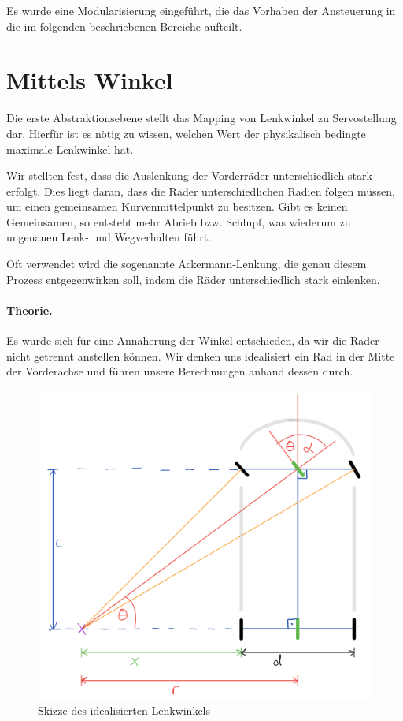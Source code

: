 \documentclass[a4paper,12pt]{report}
\begin{document}
	Es wurde eine Modularisierung eingeführt, die das Vorhaben der Ansteuerung in die im folgenden beschriebenen Bereiche aufteilt.

\section{Mittels Winkel}
\label{Steering-Angle-To-Servo}

	Die erste Abstraktionsebene stellt das Mapping von Lenkwinkel zu Servostellung dar.
	Hierfür ist es nötig zu wissen, welchen Wert der physikalisch bedingte maximale Lenkwinkel hat.

	Wir stellten fest, dass die Auslenkung der Vorderräder unterschiedlich stark erfolgt.
	Dies liegt daran, dass die Räder unterschiedlichen Radien folgen müssen, um einen gemeinsamen Kurvenmittelpunkt zu besitzen.
	Gibt es keinen Gemeinsamen, so entsteht mehr Abrieb bzw. Schlupf, was wiederum zu ungenauen Lenk- und Wegverhalten führt.

	Oft verwendet wird die sogenannte Ackermann-Lenkung, die genau diesem Prozess entgegenwirken soll, indem die Räder unterschiedlich stark einlenken.

	\paragraph{Theorie.}
	Es wurde sich für eine Annäherung der Winkel entschieden, da wir die Räder nicht getrennt anstellen können.
	Wir denken uns idealisiert ein Rad in der Mitte der Vorderachse und führen unsere Berechnungen anhand dessen durch.

	\begin{figure}[ht]
		\centering
		\includegraphics[width=\textwidth,height=\textheight,keepaspectratio]{assets/Lenkwinkel-Skizze.png}
		\caption{Skizze des idealisierten Lenkwinkels}
		\label{img-steering-angles-sketch}
	\end{figure}
	\pagebreak
\end{document}
